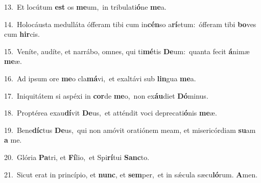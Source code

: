 {\numbfont\textcolor{\numbcolor}{13.}}~Et locútum \textbf{est} os \textbf{me}\-um,~\star in tribulati\-\textbf{ó}\-ne \textbf{me}\-a.\par
{\numbfont\textcolor{\numbcolor}{14.}}~Holocáusta medulláta ófferam tibi cum in\-\textbf{cén}\-so a\-\textbf{rí}\-etum:~\star ófferam tibi \textbf{bo}\-ves cum \textbf{hir}\-cis.\par
{\numbfont\textcolor{\numbcolor}{15.}}~Veníte, audíte, et narrábo, omnes, qui ti\-\textbf{mé}\-tis \textbf{De}\-um:~\star quanta fecit \textbf{á}\-nimæ \textbf{me}\-æ.\par
{\numbfont\textcolor{\numbcolor}{16.}}~Ad ipsum ore \textbf{me}\-o cla\-\textbf{má}\-vi,~\star et exaltávi sub \textbf{lin}\-gua \textbf{me}\-a.\par
{\numbfont\textcolor{\numbcolor}{17.}}~Iniquitátem si aspéxi in \textbf{cor}\-de \textbf{me}\-o,~\star non ex\-\textbf{áu}\-diet \textbf{Dó}\-minus.\par
{\numbfont\textcolor{\numbcolor}{18.}}~Proptérea exau\-\textbf{dí}\-vit \textbf{De}\-us,~\star et atténdit voci deprecati\-\textbf{ó}\-nis \textbf{me}\-æ.\par
{\numbfont\textcolor{\numbcolor}{19.}}~Bene\-\textbf{díc}\-tus \textbf{De}\-us,~\star qui non amóvit oratiónem meam, et misericórdiam \textbf{su}\-am \textbf{a} me.\par
{\numbfont\textcolor{\numbcolor}{20.}}~Glória \textbf{Pa}\-tri, et \textbf{Fí}\-lio,~\star et Spi\-\textbf{rí}\-tui \textbf{Sanc}\-to.\par
{\numbfont\textcolor{\numbcolor}{21.}}~Sicut erat in princípio, et \textbf{nunc}\-, et \textbf{sem}\-per,~\star et in sǽcula sæcu\-\textbf{ló}\-rum. \textbf{A}\-men.\par

